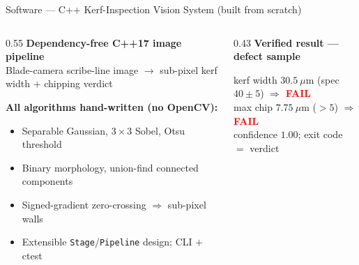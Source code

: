 \documentclass[aspectratio=169,11pt]{beamer}
\begin{document}
\begin{frame}[shrink=10]{Software --- C++ Kerf-Inspection Vision System (built from scratch)}
  \begin{columns}[T]
    \begin{column}{0.55\textwidth}
      \textbf{Dependency-free C++17 image pipeline}\\
      {\footnotesize Blade-camera scribe-line image $\to$ sub-pixel kerf width
        $+$ chipping verdict}

      \vspace{0.4em}

      \vspace{0.4em}
      \textbf{All algorithms hand-written (no OpenCV):}
      \begin{itemize}\footnotesize
        \item Separable Gaussian, $3\times3$ Sobel, Otsu threshold
        \item Binary morphology, union-find connected components
        \item Signed-gradient zero-crossing $\Rightarrow$ sub-pixel walls
        \item Extensible \texttt{Stage}/\texttt{Pipeline} design; CLI $+$ ctest
      \end{itemize}
    \end{column}
    \begin{column}{0.43\textwidth}
      \textbf{Verified result --- defect sample}
      \begin{block}{}
        \footnotesize
        kerf width $30.5~\mu$m (spec $40\pm5$) $\Rightarrow$
          \textcolor{red}{\textbf{FAIL}}\\
        max chip $7.75~\mu$m ($>5$) $\Rightarrow$
          \textcolor{red}{\textbf{FAIL}}\\
        confidence $1.00$; exit code $=$ verdict
      \end{block}


\end{column}
\end{columns}
\end{frame}
\end{document}
